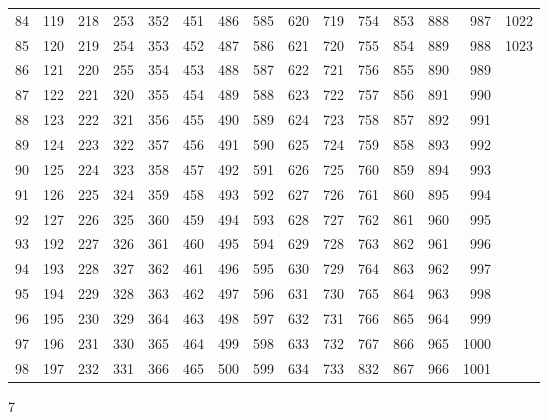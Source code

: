 \documentclass{assignment}
\begin{document}
\begin{tabular}{r r r r r r r r r r r r r r r}
84 & 119 & 218 & 253 & 352 & 451 & 486 & 585 & 620 & 719 & 754 & 853 & 888 & 987 & 1022 \\
85 & 120 & 219 & 254 & 353 & 452 & 487 & 586 & 621 & 720 & 755 & 854 & 889 & 988 & 1023 \\
86 & 121 & 220 & 255 & 354 & 453 & 488 & 587 & 622 & 721 & 756 & 855 & 890 & 989 \\
87 & 122 & 221 & 320 & 355 & 454 & 489 & 588 & 623 & 722 & 757 & 856 & 891 & 990 \\
88 & 123 & 222 & 321 & 356 & 455 & 490 & 589 & 624 & 723 & 758 & 857 & 892 & 991 \\
89 & 124 & 223 & 322 & 357 & 456 & 491 & 590 & 625 & 724 & 759 & 858 & 893 & 992 \\
90 & 125 & 224 & 323 & 358 & 457 & 492 & 591 & 626 & 725 & 760 & 859 & 894 & 993 \\
91 & 126 & 225 & 324 & 359 & 458 & 493 & 592 & 627 & 726 & 761 & 860 & 895 & 994 \\
92 & 127 & 226 & 325 & 360 & 459 & 494 & 593 & 628 & 727 & 762 & 861 & 960 & 995 \\
93 & 192 & 227 & 326 & 361 & 460 & 495 & 594 & 629 & 728 & 763 & 862 & 961 & 996 \\
94 & 193 & 228 & 327 & 362 & 461 & 496 & 595 & 630 & 729 & 764 & 863 & 962 & 997 \\
95 & 194 & 229 & 328 & 363 & 462 & 497 & 596 & 631 & 730 & 765 & 864 & 963 & 998 \\
96 & 195 & 230 & 329 & 364 & 463 & 498 & 597 & 632 & 731 & 766 & 865 & 964 & 999 \\
97 & 196 & 231 & 330 & 365 & 464 & 499 & 598 & 633 & 732 & 767 & 866 & 965 & 1000 \\
98 & 197 & 232 & 331 & 366 & 465 & 500 & 599 & 634 & 733 & 832 & 867 & 966 & 1001 \\
\end{tabular}
\newpage


7\\
\\
\end{document}
